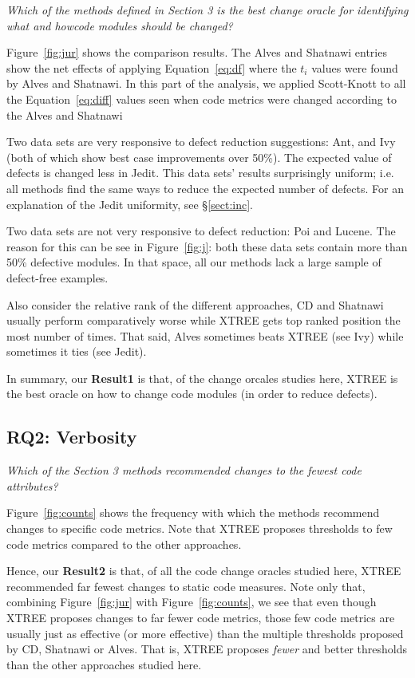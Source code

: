 \documentclass[twocolumn,5p]{elsarticle}
\newcommand{\tion}[1]{\S\ref{sect:#1}}
\newcommand{\fig}[1]{Figure~\ref{fig:#1}}
\newcommand{\eq}[1]{Equation~\ref{eq:#1}}
\theoremstyle{break}
\begin{document}
\begin{itemize}
{\em Which of the methods defined in Section 3 is the best change oracle for identifying what and howcode modules should be changed? }

\fig{jur} shows the comparison results.  The Alves and Shatnawi
entries show the net effects of applying \eq{df} where the $t_i$ values were found by Alves and Shatnawi.
 In this part of the  analysis,
we applied Scott-Knott to all the \eq{diff} values
seen when code metrics were changed
according to the  Alves and Shatnawi


Two data sets are very responsive to defect reduction suggestions:
 Ant, and Ivy (both of which show best case improvements over 50\%).
 The  expected value of defects  
 is changed less in Jedit. This data sets' results
 surprisingly uniform; i.e.   all methods
 find the same ways to reduce the expected number of
defects.   For an explanation of the Jedit uniformity, see \tion{inc}.

Two data sets are not very responsive to defect reduction:
Poi and Lucene. The reason for this can be see in \fig{j}:
both these data sets contain more than 50\% defective modules.
In that space, all our  methods lack a large sample of
defect-free examples. 

Also consider the relative
rank of the different approaches,
 CD and Shatnawi usually  perform comparatively worse while  XTREE gets top ranked position the most
number of times. That said, Alves sometimes beats XTREE (see Ivy)
while sometimes it ties (see Jedit).

In summary, our {\bf Result1} is  that, of the change orcales studies here,
XTREE is the best oracle on how to change code modules (in order to reduce defects).


 
 \subsection{RQ2: Verbosity}
 
 {\em Which of the Section 3 methods recommended changes to the fewest code attributes?}
 
\fig{counts} shows the frequency with which the methods
recommend changes to specific code metrics.
Note that XTREE proposes thresholds to
few code metrics compared to the other approaches. 

% 

Hence, our {\bf Result2} is that, of all the code change oracles studied here, XTREE recommended far fewest changes to static code measures.
Note only that,   combining  \fig{jur} with \fig{counts}, we   see that
even though XTREE proposes changes to far fewer code metrics, those few
code metrics are usually just as effective (or
more effective) than the multiple
thresholds
proposed by CD, Shatnawi or Alves.  That is, XTREE proposes
{\em fewer} and better thresholds than the other approaches studied here.
 



\end{itemize}
\end{document}
